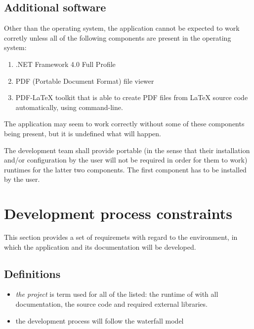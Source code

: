 \documentclass{article}
\begin{document}
\subsection{Additional software}

Other than the operating system, the application cannot be expected to work corretly unless all of the
following components are present in the operating system:

\begin{enumerate}

  \item .NET Framework 4.0 Full Profile

  \item PDF (Portable Document Format) file viewer

  \item PDF-LaTeX toolkit that is able to create PDF files from LaTeX source code automatically, using
  command-line.

\end{enumerate}

The application may seem to work correctly without some of these components being present, but it is
undefined what will happen.

The development team shall provide portable (in the sense that their installation and/or
configuration by the user will not be required in order for them to work) runtimes for the latter
two components. The first component has to be installed by the user.

\section{Development process constraints}

This section provides a set of requiremets with regard to the environment, in which the application
and its documentation will be developed.

\subsection*{Definitions}

\begin{itemize}

  \item \textit{the project} is term used for all of the listed: the runtime of \titletext{} with
  all documentation, the source code and required external libraries.

  \item the development process will follow the waterfall model

\end{itemize}
\end{document}
